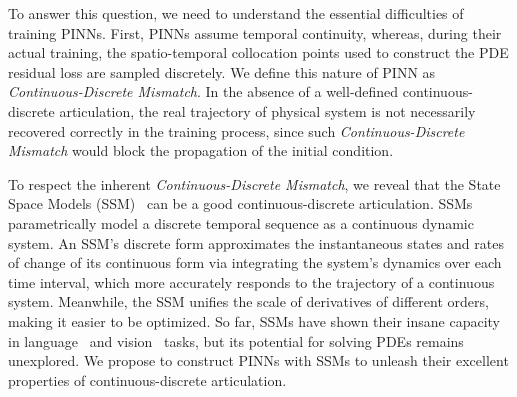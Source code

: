 \documentclass{article}
\theoremstyle{plain}
\theoremstyle{definition}
\theoremstyle{remark}
\begin{document}
To answer this question, we need to understand the essential difficulties of training PINNs.
First, PINNs assume temporal continuity, whereas, during their actual training, the spatio-temporal collocation points used to construct the PDE residual loss are sampled discretely.
       We define this nature of PINN as   \textit{Continuous-Discrete Mismatch}. 
       In the absence of a well-defined continuous-discrete articulation, the real trajectory of physical system is not necessarily recovered correctly in the training process, since such \textit{Continuous-Discrete Mismatch} would block the propagation of the initial condition.


To respect the inherent \textit{Continuous-Discrete Mismatch}, we reveal that the State Space Models (SSM)~\cite{kalman1960new} can be a good continuous-discrete articulation. 
    SSMs parametrically model a discrete temporal sequence as a continuous dynamic system. An SSM's discrete form approximates the instantaneous states and rates of change of its continuous form via integrating the system's dynamics over each time interval, which more accurately responds to the trajectory of a continuous system. Meanwhile, the SSM unifies the scale of derivatives of different orders, making it easier to be optimized.    
So far, SSMs have shown their insane capacity in language~\cite{gu2023mamba} and vision~\cite{liu2024vmamba} tasks, but its potential for solving PDEs remains unexplored. We propose to construct PINNs with SSMs to unleash their excellent properties of continuous-discrete articulation.

\end{document}
